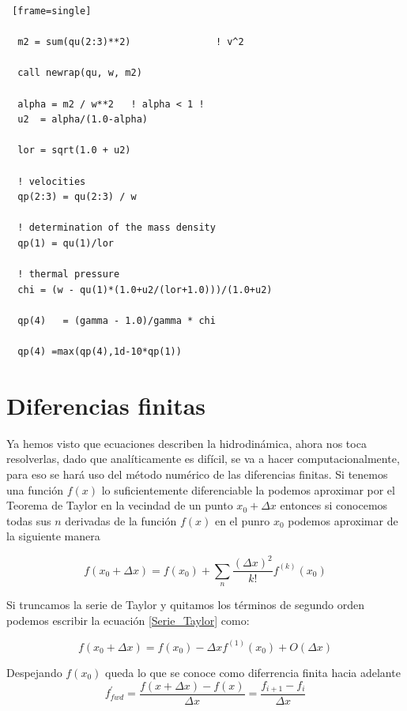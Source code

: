 \documentclass[12pt,a4paper]{book}
\begin{document}
\begin{lstlisting} [frame=single]
  
  m2 = sum(qu(2:3)**2)               ! v^2

  call newrap(qu, w, m2)

  alpha = m2 / w**2   ! alpha < 1 !
  u2  = alpha/(1.0-alpha)

  lor = sqrt(1.0 + u2)

  ! velocities
  qp(2:3) = qu(2:3) / w

  ! determination of the mass density
  qp(1) = qu(1)/lor

  ! thermal pressure
  chi = (w - qu(1)*(1.0+u2/(lor+1.0)))/(1.0+u2)

  qp(4)   = (gamma - 1.0)/gamma * chi

  qp(4) =max(qp(4),1d-10*qp(1))
\end{lstlisting}

\section{Diferencias finitas} \label{sec:Diferencias_finitas}
Ya hemos visto que ecuaciones describen la hidrodinámica, ahora nos toca resolverlas, dado que analíticamente es difícil, se va a hacer computacionalmente, para 
eso se hará uso del método numérico de las diferencias finitas.
Si tenemos una función $f(x)$ lo suficientemente diferenciable la podemos aproximar por el Teorema de Taylor  en la vecindad de un punto $x_0+\Delta x$ entonces si conocemos todas sus $n$ derivadas de la función $f(x)$ en el punro $x_0$ podemos aproximar de la siguiente manera

\begin{equation}\label{Serie_Taylor}
f\left( x_0 + \Delta x\right) = f\left( x_0 \right)+
\sum_n \frac{\left( \Delta x \right) ^2}{k!}f^{(k)} \left(x_0
\right)
\end{equation}

Si truncamos la serie de Taylor y quitamos los términos de segundo orden podemos escribir la ecuación \ref{Serie_Taylor} como:

\begin{equation}
f\left( x_0 + \Delta x \right) = f(x_0) - \Delta x f^{(1)} (x_0) + O \left( \Delta x \right)
\end{equation}

Despejando $f(x_0)$ queda lo que se conoce como diferrencia finita hacia adelante
\begin{equation}\label{fwd}
f_{fwd}^{'}=\frac{f\left(x + \Delta x \right) - f(x) }{\Delta x}=\frac{f_{i+1}-f_{i}}{\Delta x}
\end{equation}
\end{document}
